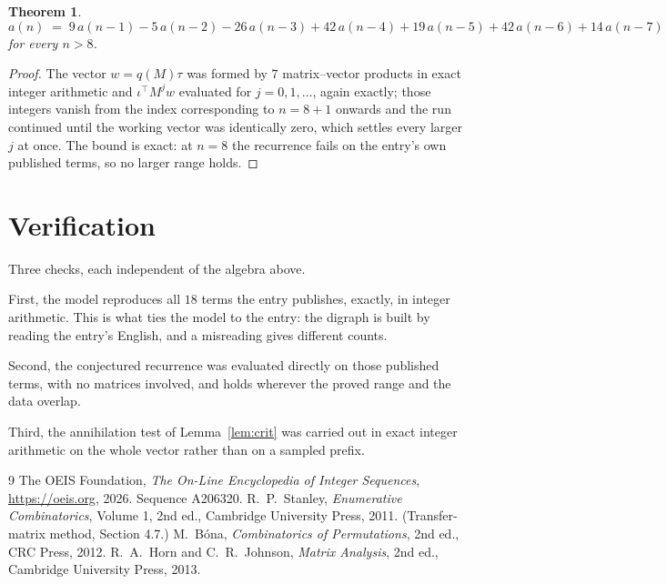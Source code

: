 \documentclass[11pt,a4paper]{article}
\theoremstyle{plain}
\newtheorem{theorem}{Theorem}
\theoremstyle{definition}
\begin{document}
\begin{theorem}
\[
a(n)\;=\;9\,a(n-1) - 5\,a(n-2) - 26\,a(n-3) + 42\,a(n-4) + 19\,a(n-5) + 42\,a(n-6) + 14\,a(n-7)
\]
for every $n>8$.
\end{theorem}

\begin{proof}
The vector $w=q(M)\tau$ was formed by $7$ matrix--vector products in exact integer
arithmetic and $\iota^{\!\top}M^{j}w$ evaluated for $j=0,1,\dots$, again exactly; those
integers vanish from the index corresponding to $n=8+1$ onwards and the run continued
until the working vector was identically zero, which settles every larger $j$ at once. The bound is exact: at $n=8$ the recurrence fails on the entry's own published terms, so no larger range holds.
\end{proof}

\section{Verification}

Three checks, each independent of the algebra above.

First, the model reproduces all $18$ terms the entry publishes, exactly, in integer
arithmetic. This is what ties the model to the entry: the digraph is built by reading the
entry's English, and a misreading gives different counts.

Second, the conjectured recurrence was evaluated directly on those published terms, with no
matrices involved, and holds wherever the proved range and the data overlap.

Third, the annihilation test of Lemma~\ref{lem:crit} was carried out in exact integer
arithmetic on the whole vector rather than on a sampled prefix.

\begin{thebibliography}{9}
 The OEIS Foundation, \emph{The On-Line Encyclopedia of Integer
Sequences}, \url{https://oeis.org}, 2026. Sequence A206320.
 R.~P.~Stanley, \emph{Enumerative Combinatorics}, Volume 1, 2nd ed.,
Cambridge University Press, 2011. (Transfer-matrix method, Section 4.7.)
 M.~B\'ona, \emph{Combinatorics of Permutations}, 2nd ed., CRC
Press, 2012.
 R.~A.~Horn and C.~R.~Johnson, \emph{Matrix Analysis}, 2nd ed., Cambridge
University Press, 2013.
\end{thebibliography}
\end{document}
